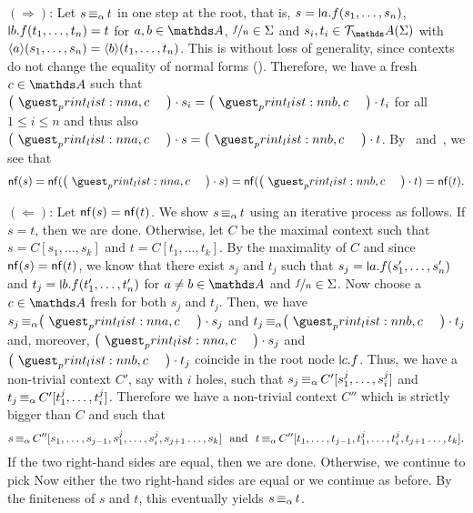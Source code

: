 \documentclass[a4paper,UKenglish,cleveref,autoref,thm-restate,numberwithinsect,final]{lipics-v2021}
\begin{document}
      \noindent $(\Rightarrow)$: Let $s \operatorname{\equiv_{\alpha}} t$ in one step at the root, that is,
      $s = \newletter{a}.f(s_1, \dots, s_n)$, $\newletter{b}.f(t_1, \dots, t_n) = t$ for
      $a, b \in \names$, $\nicefrac{f}{n} \in \Sigma$ and $s_i, t_i \in \tree_\names(\Sigma)$
      with $\langle a \rangle(s_1, \dots, s_n) = \langle b \rangle(t_1, \dots, t_n)$. This is without loss of
      generality, since contexts do not change the equality of normal forms
      (). Therefore, we have a fresh $c \in \names$ such that
      $\makecycle{a,c} \cdot s_i = \makecycle{b,c} \cdot t_i$ for all
      $1 \leqslant i \leqslant n$ and thus also
      $\makecycle{a,c} \cdot s = \makecycle{b,c} \cdot t$. By~
      and~, we see that
      \[
        \nf(s) = \nf(\makecycle{a,c} \cdot s) = \nf(\makecycle{b,c} \cdot t) = \nf(t).
      \]

      \noindent $(\Leftarrow)$: Let $\mathsf{nf}(s) = \mathsf{nf}(t)$. We show $s \operatorname{\equiv_{\alpha}} t$ using an
      iterative process as follows. If $s = t$, then we are done. Otherwise, let $C$ be the
      maximal context such that $s = C[s_1, \dots, s_k]$ and $t = C[t_1, \dots, t_k]$. By the
      maximality of $C$ and since $\mathsf{nf}(s) = \mathsf{nf}(t)$, we know that there exist $s_j$ and $t_j$
      such that $s_j = \newletter{a}.f(s_1',\dots, s_n')$ and
      $t_j = \newletter{b}.f(t_1',\dots, t_n')$ for $a\neq b \in \names$ and
      $\nicefrac{f}{n} \in \Sigma$. Now choose a $c \in \names$ fresh for both $s_j$ and
      $t_j$. Then, we have $s_j \alphaequiv \makecycle{a,c} \cdot s_j$ and
      $t_j \alphaequiv \makecycle{b,c} \cdot t_j$ and, moreover, $\makecycle{a,c} \cdot s_j$
      and $\makecycle{b,c} \cdot t_j$ coincide in the root node $\newletter{c}.f$.  Thus, we
      have a non-trivial context $C'$, say with $i$ holes, such that
      $s_j \operatorname{\equiv_{\alpha}} C'[s_1^j, \dots, s_i^j]$ and $t_j \operatorname{\equiv_{\alpha}} C'[t_1^j, \dots,
      t_i^j]$. Therefore we have a non-trivial context $C''$ which is strictly bigger than $C$
      and such that
      \[
        s \operatorname{\equiv_{\alpha}} C''[s_1, \dots, s_{j-1}, s_1^j, \dots, s_i^j, s_{j+1}\dots, s_k]
        \ \ \text{and}\ \
        t \operatorname{\equiv_{\alpha}} C''[t_1, \dots, t_{j-1}, t_1^j, \dots, t_i^j, t_{j+1}\dots, t_k].
      \]
      If the two right-hand sides are equal, then we are done. Otherwise, we continue to pick 
      Now either the two right-hand sides are equal or we continue as before. By the finiteness
      of $s$ and $t$, this eventually yields $s \operatorname{\equiv_{\alpha}} t$.

    
    
\end{document}
